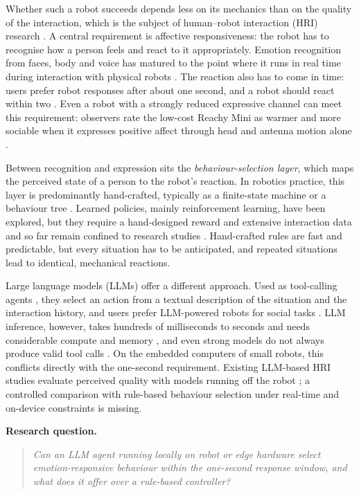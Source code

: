 \documentclass[conference]{IEEEtran}
\begin{document}
Whether such a robot succeeds depends less on its mechanics than on the
quality of the interaction, which is the subject of human--robot interaction
(HRI) research \cite{Goodrich2007HRI}. A central requirement is affective
responsiveness: the robot has to recognise how a person feels and react to it
appropriately. Emotion recognition from faces, body and voice has matured
to the point where it runs in real time during interaction with physical
robots \cite{Spezialetti2020Emotion}. The reaction also has to come in time: users
prefer robot responses after about one second, and a robot should react
within two \cite{Shiwa2008Respond}. Even a robot with a strongly reduced
expressive channel can meet this requirement: observers rate the low-cost
Reachy Mini as warmer and more sociable when it expresses positive affect
through head and antenna motion alone \cite{Rogel2026Reachy}.

Between recognition and expression sits the \emph{behaviour-selection layer},
which maps the perceived state of a person to the robot's reaction. In
robotics practice, this layer is predominantly hand-crafted, typically as a
finite-state machine or a behaviour tree
\cite{Ghzouli2023BTSM,Iovino2022BTSurvey}. Learned policies, mainly reinforcement
learning, have been explored, but they require a hand-designed reward and
extensive interaction data and so far remain confined to research studies
\cite{Akalin2021RL}. Hand-crafted rules are fast and predictable, but every
situation has to be anticipated, and repeated situations lead to identical,
mechanical reactions.

Large language models (LLMs) offer a different approach. Used as
tool-calling agents \cite{Yao2023ReAct}, they select an action from a textual
description of the situation and the interaction history, and users prefer
LLM-powered robots for social tasks \cite{Kim2024LLMHRI}. LLM inference,
however, takes hundreds of milliseconds to seconds and needs considerable
compute and memory \cite{Abstreiter2025Edge}, and even strong models do not
always produce valid tool calls \cite{Patil2025BFCL}. On the embedded
computers of small robots, this conflicts directly with the one-second
requirement. Existing LLM-based HRI studies evaluate perceived quality with
models running off the robot \cite{Kim2024LLMHRI}; a
controlled comparison with rule-based behaviour selection under real-time and
on-device constraints is missing.

\textbf{Research question.}
\begin{quote}
\emph{Can an LLM agent running locally on robot or edge hardware select
emotion-responsive behaviour within the one-second response window, and what
does it offer over a rule-based controller?}
\end{quote}
\end{document}
